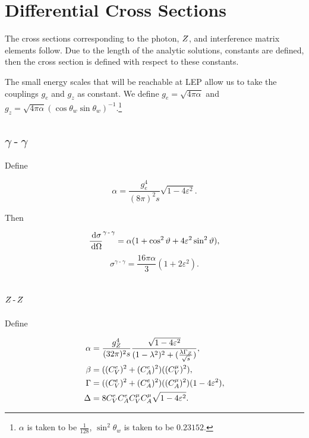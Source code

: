 \documentclass[]{article}
\begin{document}
\newpage

\appendix
\section{Differential Cross Sections}\label{app:differentials}

The cross sections corresponding to the photon, $Z $, and interference matrix elements follow. Due to the length of the analytic solutions, constants are defined, then the cross section is defined with respect to these constants.

The small energy scales that will be reachable at LEP allow us to take the couplings $g_{e}$ and $g_{z}$ as constant. We define $g_{e}=\sqrt{4\pi\alpha}$ and $g_{z}=\sqrt{4\pi\alpha}(\cos{\theta_{w}}\sin{\theta_{w}})^{-1}$.\footnote{$\alpha$ is taken to be $\frac{1}{128}$, $\sin^{2}{\theta_{w}}$ is taken to be $0.23152$.}

\subsection{$\gamma\operatorname{-}\gamma$}

Define

$$
\alpha = \frac{g_{e}^{4}}{(8\pi)^{2}s} \sqrt{1-4\varepsilon^{2}}.
$$

Then

$$
\frac{\,\operatorname{d}\!{\sigma}}{\,\operatorname{d}\!{\Omega}}^{\gamma\operatorname{-}\gamma} = \alpha (1 + \cos^{2}{\vartheta} + 4\varepsilon^{2}\sin^{2}{\vartheta}),
$$
\begin{equation}
\sigma^{\gamma\operatorname{-}\gamma} = \frac{16\pi\alpha}{3}(1 + 2\varepsilon^{2}).
\end{equation}

\subsection{$Z \operatorname{-}Z $}

Define

\begin{align*}
\alpha &= \frac{g_{\Zzero}^{4}}{(32\pi)^{2}s} \frac{\sqrt{1-4\varepsilon^{2}}}{(1-\lambda^{2})^{2} + (\frac{\lambda\GZ}{\rts})},
\\
\beta &= ((C_{V}^{e})^{2} + (C_{A}^{e})^{2})((C_{V}^{\mu})^{2}),
\\
\Gamma &= ((C_{V}^{e})^{2} + (C_{A}^{e})^{2})((C_{A}^{\mu})^{2})(1-4\varepsilon^{2}),
\\
\Delta &= 8C_{V}^{e}C_{A}^{e}C_{V}^{\mu}C_{A}^{\mu}\sqrt{1-4\varepsilon^{2}}.
\end{align*}
\end{document}
